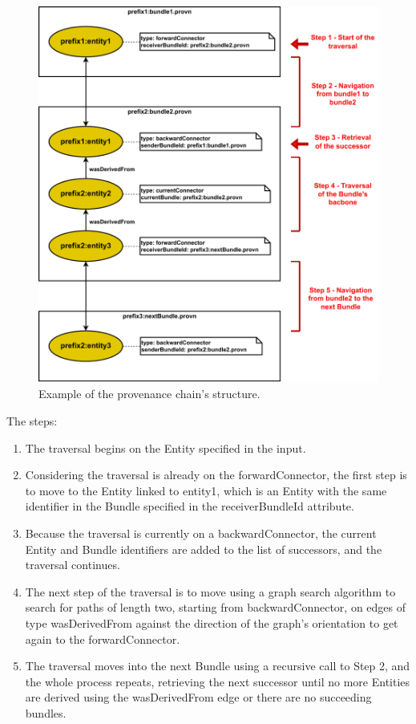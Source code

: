 \documentclass[
  digital,     %
  oneside,     %
  nosansbold,  %
  nocolorbold, %
  lof,         %
  lot,         %
]{fithesis4}
\begin{document}
\begin{figure}[htbp]
  \begin{center}
    \includegraphics[width=11.5cm]{fithesis/images/algorithm.pdf}
  \end{center}
  \caption{Example of the provenance chain's structure.}
  \label{fig:algorithm-Chain}
\end{figure}
\shorthandon{-}

The steps:
\begin{enumerate}
    \item The traversal begins on the Entity specified in the input.
    \item Considering the traversal is already on the forwardConnector, the first step is to move to the Entity linked to entity1, which is an Entity with the same identifier in the Bundle specified in the receiverBundleId attribute.
    \item Because the traversal is currently on a backwardConnector, the current Entity and Bundle identifiers are added to the list of successors, and the traversal continues.
    \item The next step of the traversal is to move using a graph search algorithm to search for paths of length two, starting from backwardConnector, on edges of type wasDerivedFrom against the direction of the graph's orientation to get again to the forwardConnector.
    \item The traversal moves into the next Bundle using a recursive call to Step 2, and the whole process repeats, retrieving the next successor until no more Entities are derived using the wasDerivedFrom edge or there are no succeeding bundles.
\end{enumerate}
\end{document}
